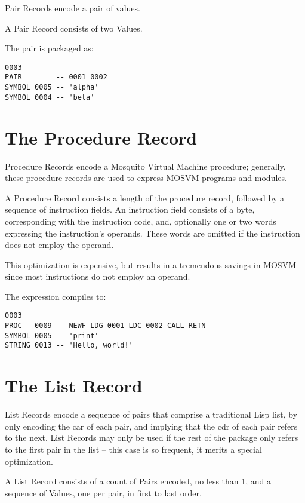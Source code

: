 \documentclass[notitlepage,oneside]{book}
\begin{document}
Pair Records encode a pair of values.

A Pair Record consists of two Values.

The pair  is packaged as:
\begin{verbatim}
0003
PAIR        -- 0001 0002
SYMBOL 0005 -- 'alpha'
SYMBOL 0004 -- 'beta'
\end{verbatim}

\section{The Procedure Record}
\label{proc-record}

Procedure Records encode a Mosquito Virtual Machine procedure; generally, these procedure records are used to express MOSVM programs and modules.  

A Procedure Record consists a length of the procedure record, followed by a sequence of instruction fields.  An instruction field consists of a byte, corresponding with the instruction code, and, optionally one or two words expressing the instruction's operands.  These words are omitted if the instruction does not employ the operand.

This optimization is expensive, but results in a tremendous savings in MOSVM since most instructions do not employ an operand.

The expression  compiles to:


\begin{verbatim}
0003
PROC   0009 -- NEWF LDG 0001 LDC 0002 CALL RETN
SYMBOL 0005 -- 'print'
STRING 0013 -- 'Hello, world!'
\end{verbatim}

\section{The List Record}
\label{list-record}

List Records encode a sequence of pairs that comprise a traditional Lisp list, by only encoding the car of each pair, and implying that the cdr of each pair refers to the next.  List Records may only be used if the rest of the package only refers to the first pair in the list -- this case is so frequent, it merits a special optimization.

A List Record consists of a count of Pairs encoded, no less than 1, and a sequence of Values, one per pair, in first to last order.
\end{document}
